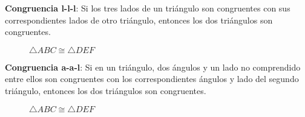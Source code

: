 \begin{postulate}{\textbf{Congruencia l-l-l}:}
    Si los tres lados de un triángulo son congruentes con sus correspondientes lados de otro triángulo, entonces los dos triángulos son congruentes.

    \begin{figure}[h!]

        \centering

        \begin{subfigure}[b]{.5\textwidth}
            \centering
            
            \label{fig:congruence-lll1}
        \end{subfigure}%
        \begin{subfigure}[b]{.5\textwidth}
            \centering
            
            \label{fig:congruence-lll2}
        \end{subfigure}

        \centering
        \caption{$\triangle{ABC} \cong \triangle{DEF}$}
        \label{fig:congruencia-lll}
        
    \end{figure}    
    
\end{postulate}

\begin{postulate}{\textbf{Congruencia a-a-l}:}
    Si en un triángulo, dos ángulos y un lado no comprendido entre ellos son congruentes con los correspondientes ángulos y lado del segundo triángulo, entonces los dos triángulos son congruentes.

    \begin{figure}[h!]

        \centering

        \begin{subfigure}[b]{.5\textwidth}
            \centering
            
            \label{fig:congruence-aal1}
        \end{subfigure}%
        \begin{subfigure}[b]{.5\textwidth}
            \centering
            
            \label{fig:congruence-aal2}
        \end{subfigure}

        \centering
        \caption{$\triangle{ABC} \cong \triangle{DEF}$}
        \label{fig:congruencia-aal}
        
    \end{figure}    
    
\end{postulate}

